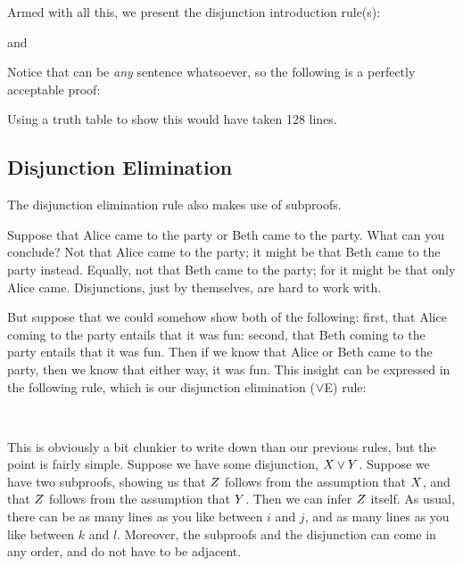 Armed with all this, we present the disjunction introduction rule(s):
\begin{highlighted}\begin{fitchproof}
		\ellipsesline
		\ellipsesline
	\end{fitchproof}
	and
	\begin{fitchproof}
		\ellipsesline
		\ellipsesline
\end{fitchproof}\end{highlighted}
Notice that \metaY can be \emph{any} sentence whatsoever, so the following is a perfectly acceptable proof:
\begin{fitchproof}
\end{fitchproof}
Using a truth table to show this would have taken 128 lines.

\subsection{Disjunction Elimination}\label{sec:orE}
The disjunction elimination rule also makes use of subproofs.

Suppose that  Alice came to the party or Beth came to the party. What can you conclude? Not that Alice came to the party; it might be that Beth came to the party instead. Equally, not that Beth came to the party; for it might be that only Alice came. Disjunctions, just by themselves, are hard to work with.

But suppose that we could somehow show both of the following: first, that Alice coming to the party entails that it was fun: second, that Beth coming to the party entails that it was fun. Then if we know that Alice or Beth came to the party, then we know that either way, it was fun. This insight can be expressed in the following rule, which is our disjunction elimination ($\vee$E) rule:
\begin{highlighted}
	\begin{fitchproof}
	\\	\open
			\ellipsesline
		\close
		\open
			\ellipsesline
		\close
		 
	\end{fitchproof}\end{highlighted}
This is obviously a bit clunkier to write down than our previous rules, but the point is fairly simple. Suppose we have some disjunction, $X \vee Y$. Suppose we have two
subproofs,
showing us that $Z$ follows from
the assumption that
$X$, and that $Z$ follows from
the assumption that
$Y$. Then we can infer $Z$ itself. As usual, there can be as many lines as you like between
$i$ and $j$, and as many lines as you like between $k$ and $l$.
Moreover,
the subproofs and the disjunction
can come in any order, and do not have to be adjacent.

